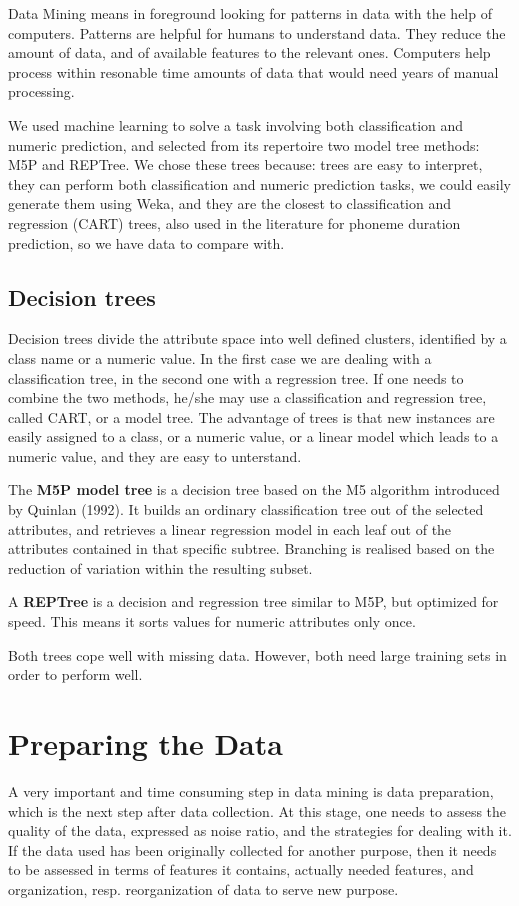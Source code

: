\documentclass[11pt,a4paper]{scrbook}
\begin{document}
Data Mining means in foreground looking for patterns in data with the help of computers. Patterns are helpful for humans to understand data. They reduce the amount of data, and of available features to the relevant ones. Computers help process within resonable time amounts of data that would need years of manual processing.

We used machine learning to solve a task involving both classification and numeric prediction, and selected from its repertoire two model tree methods: M5P and REPTree. We chose these trees because: trees are easy to interpret, they can perform both classification and numeric prediction tasks, we could easily generate them using Weka, and they are the closest to classification and regression (CART) trees, also used in the literature \cite{Brinckmann_2003} for phoneme duration prediction, so we have data to compare with.

\subsection{Decision trees}
\label{dec_trees}
Decision trees divide the attribute space into well defined clusters, identified by a class name or a numeric value. In the first case we are dealing with a classification tree, in the second one with a regression tree. If one needs to combine the two methods, he/she may use a classification and regression tree, called CART, or a model tree. The advantage of trees is that new instances are easily assigned to a class, or a numeric value, or a linear model which leads to a numeric value, and they are easy to unterstand.

The \textbf{M5P model tree} is a decision tree based on the M5 algorithm introduced by Quinlan (1992). It builds an ordinary classification tree out of the selected attributes, and retrieves a linear regression model in each leaf out of the attributes contained in that specific subtree. Branching is realised based on the reduction of variation within the resulting subset.

A \textbf{REPTree} is a decision and regression tree similar to M5P, but optimized for speed. This means it sorts values for numeric attributes only once. 

Both trees cope well with missing data. However, both need large training sets in order to perform well.

\section{Preparing the Data}
A very important and time consuming step in data mining is data preparation, which is the next step after data collection. At this stage, one needs to assess the quality of the data, expressed as noise ratio, and the strategies for dealing with it. If the data used has been originally collected for another purpose, then it needs to be assessed in terms of features it contains, actually needed features, and organization, resp. reorganization of data to serve new purpose. 
\end{document}
